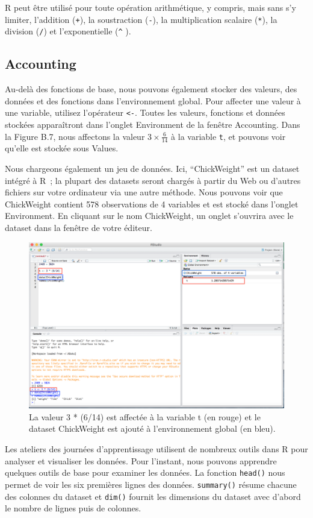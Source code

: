 \documentclass[
  12pt,
]{book}
\begin{document}
R peut être utilisé pour toute opération arithmétique, y compris, mais sans s'y limiter, l'addition (\texttt{+}), la soustraction (\texttt{-}), la multiplication scalaire (\texttt{*}), la division (\texttt{/}) et l'exponentielle (\texttt{\^{}} ).

\hypertarget{accounting}{%
\subsection{Accounting}\label{accounting}}

Au-delà des fonctions de base, nous pouvons également stocker des valeurs, des données et des fonctions dans l'environnement global. Pour affecter une valeur à une variable, utilisez l'opérateur \texttt{\textless{}-}. Toutes les valeurs, fonctions et données stockées apparaîtront dans l'onglet Environment de la fenêtre Accounting. Dans la Figure B.7, nous affectons la valeur \(3 \times \frac{6}{14}\) à la variable \texttt{t}, et pouvons voir qu'elle est stockée sous Values.

Nous chargeons également un jeu de données. Ici, ``ChickWeight'' est un dataset intégré à R~; la plupart des datasets seront chargés à partir du Web ou d'autres fichiers sur votre ordinateur via une autre méthode. Nous pouvons voir que ChickWeight contient 578 observations de 4 variables et est stocké dans l'onglet Environment. En cliquant sur le nom ChickWeight, un onglet s'ouvrira avec le dataset dans la fenêtre de votre éditeur.

\begin{figure}
\includegraphics[width=0.6\linewidth]{Images/save_data} \caption{La valeur 3 * (6/14) est affectée à la variable t (en rouge) et le dataset ChickWeight est ajouté à l'environnement global (en bleu).}\label{fig:savedata}
\end{figure}

Les ateliers des journées d'apprentissage utilisent de nombreux outils dans R pour analyser et visualiser les données. Pour l'instant, nous pouvons apprendre quelques outils de base pour examiner les données. La fonction \texttt{head()} nous permet de voir les six premières lignes des données. \texttt{summary()} résume chacune des colonnes du dataset et \texttt{dim()} fournit les dimensions du dataset avec d'abord le nombre de lignes puis de colonnes.
\end{document}

